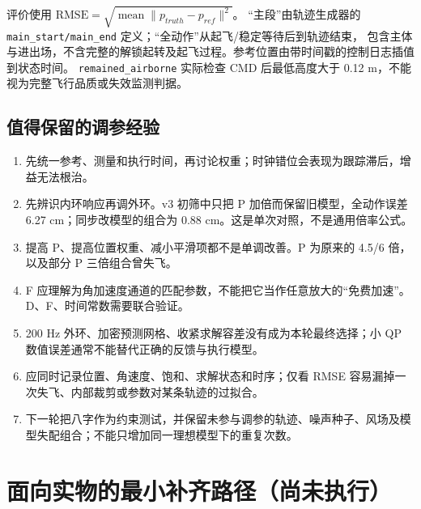 \documentclass[UTF8,a4paper,11pt,fontset=fandol]{ctexart}
\newcommand{\code}[1]{{\small\nolinkurl{#1}}}
\begin{document}
评价使用 $\mathrm{RMSE}=\sqrt{\operatorname{mean}\lVert p_{truth}-p_{ref}\rVert^2}$。
“主段”由轨迹生成器的 \code{main_start/main_end} 定义；“全动作”从起飞/稳定等待后到轨迹结束，
包含主体与进出场，不含完整的解锁起转及起飞过程。参考位置由带时间戳的控制日志插值到状态时间。
\code{remained_airborne} 实际检查 CMD 后最低高度大于 0.12 m，不能视为完整飞行品质或失效监测判据。

\subsection{值得保留的调参经验}
\begin{enumerate}
\item 先统一参考、测量和执行时间，再讨论权重；时钟错位会表现为跟踪滞后，增益无法根治。
\item 先辨识内环响应再调外环。v3 初筛中只把 P 加倍而保留旧模型，全动作误差 6.27 cm；同步改模型的组合为 0.88 cm。这是单次对照，不是通用倍率公式。
\item 提高 P、提高位置权重、减小平滑项都不是单调改善。P 为原来的 4.5/6 倍，以及部分 P 三倍组合曾失飞。
\item F 应理解为角加速度通道的匹配参数，不能把它当作任意放大的“免费加速”。D、F、时间常数需要联合验证。
\item 200 Hz 外环、加密预测网格、收紧求解容差没有成为本轮最终选择；小 QP 数值误差通常不能替代正确的反馈与执行模型。
\item 应同时记录位置、角速度、饱和、求解状态和时序；仅看 RMSE 容易漏掉一次失飞、内部裁剪或参数对某条轨迹的过拟合。
\item 下一轮把八字作为约束测试，并保留未参与调参的轨迹、噪声种子、风场及模型失配组合；不能只增加同一理想模型下的重复次数。
\end{enumerate}

\section{面向实物的最小补齐路径（尚未执行）}
\end{document}
